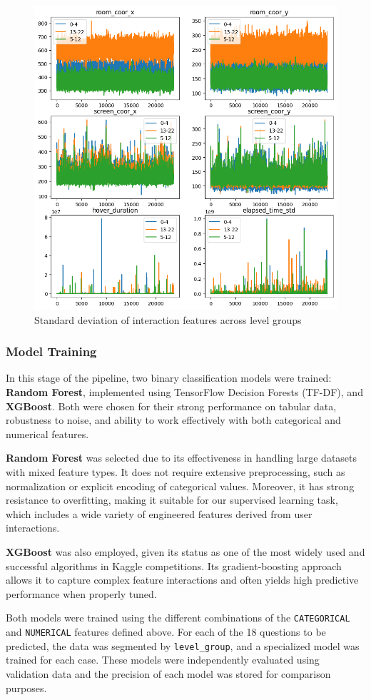 \documentclass[12pt]{article}
\begin{document}
	\begin{figure}[H]
		\centering
		\includegraphics[width=0.5\linewidth]{src/othergrpahics.png}
		\caption{Standard deviation of interaction features across level groups}
		\label{fig:feature-variability}
	\end{figure}
	
	
	\subsubsection{Model Training}
	
	In this stage of the pipeline, two binary classification models were trained: \textbf{Random Forest}, implemented using TensorFlow Decision Forests (TF-DF), and \textbf{XGBoost}. Both were chosen for their strong performance on tabular data, robustness to noise, and ability to work effectively with both categorical and numerical features.
	
	\textbf{Random Forest} was selected due to its effectiveness in handling large datasets with mixed feature types. It does not require extensive preprocessing, such as normalization or explicit encoding of categorical values. Moreover, it has strong resistance to overfitting, making it suitable for our supervised learning task, which includes a wide variety of engineered features derived from user interactions.
	
	\textbf{XGBoost} was also employed, given its status as one of the most widely used and successful algorithms in Kaggle competitions. Its gradient-boosting approach allows it to capture complex feature interactions and often yields high predictive performance when properly tuned.
	
	Both models were trained using the different combinations of the \texttt{CATEGORICAL} and \texttt{NUMERICAL} features defined above. For each of the 18 questions to be predicted, the data was segmented by \texttt{level\_group}, and a specialized model was trained for each case. These models were independently evaluated using validation data and the precision of each model was stored for comparison purposes.
	
\end{document}
